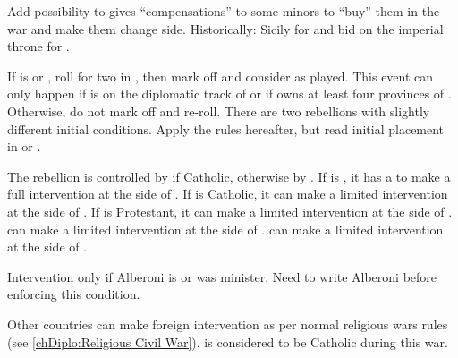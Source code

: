
\begin{todo}
  Add possibility to gives ``compensations'' to some minors to ``buy'' them in
  the war and make them change side. Historically: Sicily for \paysSavoie and
  bid on the imperial throne for \paysBaviere.
\end{todo}










\condition{}
\aparag If \ANG is \CATHCR or \CATHCO, roll for two \REVOLT in \ANG, then mark
off and consider as played.
\aparag This event can only happen if \paysecosse is on the diplomatic track
of \ANG or if \ANG owns at least four provinces of \paysecosse. Otherwise, do
not mark off and re-roll.
\aparag There are two rebellions with slightly different initial
conditions. Apply the rules hereafter, but read initial placement in
 or .

\phdipl
\aparag The rebellion is controlled by \FRA if Catholic, otherwise by \HIS.
\aparag If \FRA is \CATHCR, it has a \CB to make a full intervention at the
side of \paysecosse.
\bparag If \FRA is Catholic, it can make a limited intervention at the side of
\paysecosse.
\bparag If \FRA is Protestant, it can make a limited intervention at the side
of \ANG.
\aparag \HOL can make a limited intervention at the side of \ANG.
\aparag \HIS can make a limited intervention at the side of \paysecosse.
\begin{todo}
  Intervention only if Alberoni is or was minister. Need to write Alberoni
  before enforcing this condition.
\end{todo}
\aparag Other countries can make foreign intervention as per normal religious
wars rules (see \ref{chDiplo:Religious Civil War}). \paysecosse is considered
to be Catholic during this war.


